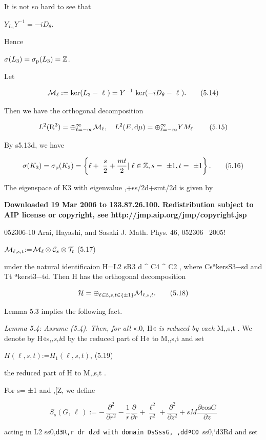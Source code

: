 \documentclass{article}
\begin{document}
It is not so hard to see that

$Y_{L_{3}}Y^{-1}=-iD_{\theta}$.

Hence

$\sigma(L_{3})=\sigma_{\rm p}(L_{3})=\mathbb{Z}$.

Let

$${\cal M}_{\ell}:={\rm ker}(L_{3}-\ \ell\ )=Y^{-1}\ {\rm ker}(-iD_{\theta}-\ \ell\ ).\tag{5.14}$$

Then we have the orthogonal decomposition

$$L^{2}({\rm R}^{3})=\oplus^{\infty}_{\ell=-\infty}{\cal M}_{\ell},\quad L^{2}(E,{\rm d}\mu)=\oplus^{\infty}_{\ell=-\infty}YM_{\ell}.\tag{5.15}$$

By s5.13d, we have

$$\sigma(K_{3})=\sigma_{\rm p}(K_{3})=\left\{\ell+\ \frac{s}{2}+\frac{mt}{2}|\ \ell\in\mathbb{Z},s=\ \pm1,t=\ \pm1\right\}.\tag{5.16}$$

The eigenspace of K3 with eigenvalue ,+ss/2d+smt/2d is given by

\textbf{Downloaded 19 Mar 2006 to 133.87.26.100. Redistribution subject to AIP license or copyright, see http://jmp.aip.org/jmp/copyright.jsp}

052306-10 Arai, Hayashi, and Sasaki J. Math. Phys. 46, 052306 ~2005!

${\cal M}_{\ell,s,t}$:=${\cal M}_{\ell}\otimes{\cal C}_{s}\otimes{\cal T}_{t}$ (5.17)

under the natural identificaion H=L2 sR3 d ^ C4 ^ C2 , where CsªkersS3−sd and Tt ªkerst3−td. Then H has the orthogonal decomposition

$${\cal H}=\oplus_{\ell\in{\mathbb{Z}},s,t\in\{\pm1\}}{\cal M}_{\ell,s,t}.\tag{5.18}$$

Lemma 5.3 implies the following fact.

\textit{Lemma 5.4: Assume (5.4). Then, for all} «.0, H« \textit{is reduced by each} M,,s,t . We denote by H«s,\textit{,s,t}d by the reduced part of H« to M,,s,t and set

$H(\ell,s,t)$:=$H_{1}(\ell,s,t)$, (5.19)

the reduced part of H to M,,s,t .

For s= ±1 and ,[Z, we define

$$S_{s}(G,\,\ell\,):=-\,\frac{\partial^{2}}{\partial r^{2}}-\frac{1}{r}\frac{\partial}{\partial r}+\frac{\ell^{2}}{r^{2}}+\frac{\partial^{2}}{\partial z^{2}}+sM\frac{\partial\mbox{cos}G}{\partial z}\tag{5.20}$$

acting in L2 ss0,\verb|d3R,r dr dzd with domain DsSssG, ,ddªC0 |ss0,`d3Rd and set
\end{document}
